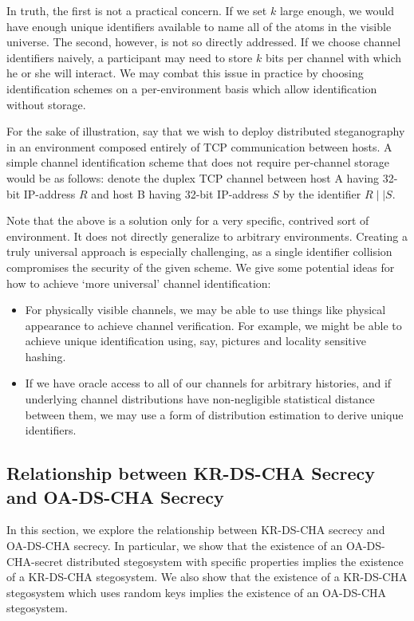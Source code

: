 \documentclass{article}
\begin{document}
In truth, the first is not a practical concern.  If we set $k$ large enough, we would have 
enough unique identifiers available to name all of the atoms in the visible universe.  The second, 
however, is not so directly addressed.  If we choose channel identifiers naively, a participant may need to  
store $k$ bits per channel with which he or she will interact.  We may combat this issue in practice by 
choosing identification schemes on a per-environment basis which allow identification without storage.  

For the sake of illustration, say that we wish to deploy distributed steganography in an environment 
composed entirely of TCP communication between hosts.  A simple channel identification scheme that 
does not require per-channel storage would be as follows: denote the duplex TCP channel between 
host A having 32-bit IP-address $R$ and host B having 32-bit IP-address $S$ by the identifier 
$R \mid \mid S$.  

Note that the above is a solution only for a very specific, contrived sort of environment.  It does not 
directly generalize to arbitrary environments.  Creating a truly universal approach is especially challenging, 
as a single identifier collision compromises the security of the given scheme.  We give some potential ideas 
for how to achieve `more universal' channel identification:

\begin{itemize}
\item{For physically visible channels, we may be able to use things like physical appearance to 
achieve channel verification.  For example, we might be able to achieve unique identification using, say, 
pictures and locality sensitive hashing.}
\item{If we have oracle access to all of our channels for arbitrary histories, and if underlying channel distributions have non-negligible statistical distance between them, we may use a form of distribution estimation to derive unique 
identifiers.}
\end{itemize}

\subsection{Relationship between KR-DS-CHA Secrecy and OA-DS-CHA Secrecy}

In this section, we explore the relationship between KR-DS-CHA secrecy and OA-DS-CHA secrecy.  
In particular, we show that the existence of an OA-DS-CHA-secret distributed stegosystem with specific 
properties implies the existence of a KR-DS-CHA stegosystem.  We also show that the existence of a KR-DS-CHA 
stegosystem which uses random keys implies the existence of an OA-DS-CHA stegosystem.   
\end{document}
